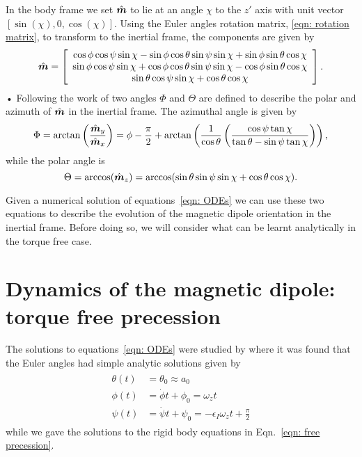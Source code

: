 \documentclass[../full_thesis/full_thesis.tex]{subfiles}
\begin{document}
In the body frame we set $\hat{\boldsymbol{m}}$ to lie at an angle $\chi$ to the $z'$ axis with
unit vector $[\sin(\chi), 0, \cos(\chi)]$. Using the Euler angles rotation
matrix, \eqref{eqn: rotation matrix}, to transform to the inertial frame, the
components are given by
\begin{equation}
\hat{\boldsymbol{m}} =
\left[\begin{array}{c}
\cos\phi\cos\psi\sin\chi - \sin\phi \cos \theta \sin \psi \sin \chi
+ \sin \phi \sin \theta \cos \chi \\
\sin\phi\cos\psi\sin\chi + \cos\phi \cos \theta \sin \psi \sin \chi
- \cos \phi \sin \theta \cos \chi \\
\sin\theta \cos\psi \sin\chi + \cos\theta \cos \chi
\end{array}\right].
\label{eqn: m inertial}
\end{equation}•
Following the work of \citet{Jones2001} two angles $\Phi$ and $\Theta$ are
defined to describe the polar and azimuth of $\hat{\boldsymbol{m}}$ in the inertial frame.
The azimuthal angle is given by
\begin{equation}
    \Phi = \arctan\left(\frac{\hat{\boldsymbol{m}}_{y}}{\hat{\boldsymbol{m}}_{x}}\right) =
\phi - \frac{\pi}{2} + \arctan\left(\frac{1}{\cos\theta}
                       \left(\frac{\cos\psi \tan \chi}{\tan\theta -
                       \sin \psi \tan\chi }\right)\right),
\label{eqn: Phi}
\end{equation}
while the polar angle is
\begin{equation}
\Theta = \arccos(\hat{\boldsymbol{m}}_{z}) = \arccos(\sin \theta \sin \psi \sin \chi + \cos \theta \cos \chi ).
\label{eqn: Theta 2}
\end{equation}

Given a numerical solution of equations~\eqref{eqn: ODEs} we can use these two
equations to describe the evolution of the magnetic dipole orientation in the
inertial frame. Before doing so, we will consider what can be learnt analytically
in the torque free case.

\section{Dynamics of the magnetic dipole: torque free precession}
\label{sec: understanding the motion of m}

The solutions to equations~\eqref{eqn: ODEs} were studied by \citet{Jones2001}
where it was found that the Euler angles had simple analytic solutions given by
\begin{align}
\begin{split}
    \theta(t) & = \theta_{0} \approx a_{0} \\
    \phi(t) & = \dot{\phi}t + \phi_{0} = \omega_{z} t \\
    \psi(t) & = \dot{\psi}t + \psi_{0}= -\epsilon_{I}\omega_{z}t+\frac{\pi}{2}
\end{split}
\label{eqn: euler angles torque free evolution}
\end{align}
while we gave the solutions to the rigid body equations in Eqn.~\eqref{eqn:
free precession}.
\end{document}
